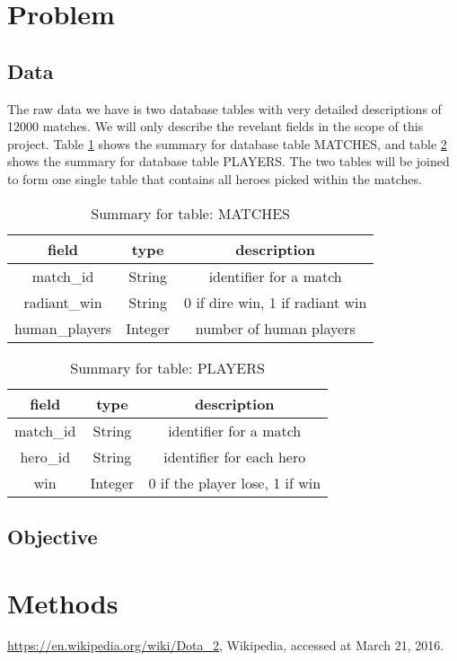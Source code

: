 \documentclass[11pt]{article}
\begin{document}
\section{Problem}
\subsection{Data}
The raw data we have is two database tables with very detailed descriptions of 12000 matches. We will only describe the revelant fields in the scope of this project. Table \ref{matches} shows the summary for database table MATCHES, and table \ref{players} shows the summary for database table PLAYERS. The two tables will be joined to form one single table that contains all heroes picked within the matches.

\begin{table}[h]
  \begin{center}
	\begin{tabular}{| c | c | c |}\hline
		field & type & description \\\hline
		match\_id & String & identifier for a match \\\hline
		radiant\_win & String & 0 if dire win, 1 if radiant win \\\hline
		human\_players & Integer & number of human players \\\hline
	\end{tabular}
	\caption{Summary for table: MATCHES}\label{matches}
  \end{center}
\end{table}

\begin{table}[h]
	\begin{center}
		\begin{tabular}{| c | c | c |}\hline
			field & type & description \\\hline
			match\_id & String & identifier for a match \\\hline
			hero\_id & String & identifier for each hero \\\hline
			win & Integer & 0 if the player lose, 1 if win \\\hline
		\end{tabular}
		\caption{Summary for table: PLAYERS}\label{players}
	\end{center}
\end{table}

\subsection{Objective}

\section{Methods}

\begin{thebibliography}{9}
 \url{https://en.wikipedia.org/wiki/Dota_2}, Wikipedia, accessed at March 21, 2016.

\end{thebibliography}
\end{document}
